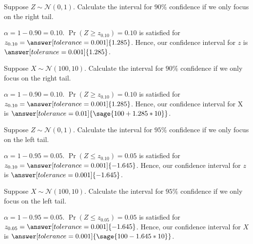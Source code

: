 \documentclass{ximera}
\begin{document}
\begin{problem}
Suppose $Z\sim \mathcal N(0,1)$. Calculate the interval for $90\%$ confidence if we only focus on the right tail. 
\begin{explanation}
$\alpha=1-0.90=0.10$.
$\Pr(Z\geq z_{0.10})=0.10$ is satisfied for $z_{0.10}=\answer[tolerance=0.001]{1.285}$. Hence, our confidence interval for $z$ is  $\answer[tolerance=0.001]{1.285}$.

\end{explanation}
\end{problem}

\begin{problem}
Suppose $X\sim \mathcal N(100,10)$. Calculate the interval for $90\%$ confidence if we only focus on the right tail. 
\begin{explanation}
$\alpha=1-0.90=0.10$.
$\Pr(Z\geq z_{0.10})=0.10$ is satisfied for $z_{0.10}=\answer[tolerance=0.001]{1.285}$. Hence, our confidence interval for X is  $\answer[tolerance=0.01]{\sage{100+1.285*10}}$.

\end{explanation}
\end{problem}


\begin{problem}
Suppose $Z\sim \mathcal N(0,1)$. Calculate the interval for $95\%$ confidence if we only focus on the left tail. 
\begin{explanation}
$\alpha=1-0.95=0.05$.
$\Pr(Z\leq z_{0.10})=0.05$ is satisfied for $z_{0.10}=\answer[tolerance=0.001]{-1.645}$. Hence, our confidence interval for $z$ is  $\answer[tolerance=0.001]{-1.645}$.

\end{explanation}
\end{problem}


\begin{problem}
Suppose $X\sim \mathcal N(100,10)$. Calculate the interval for $95\%$ confidence if we only focus on the left tail. 
\begin{explanation}
$\alpha=1-0.95=0.05$.
$\Pr(Z\leq z_{0.05})=0.05$ is satisfied for $z_{0.05}=\answer[tolerance=0.001]{-1.645}$. Hence, our confidence interval for $X$ is  $\answer[tolerance=0.001]{\sage{100-1.645*10}}$.

\end{explanation}
\end{problem}
\end{document}
